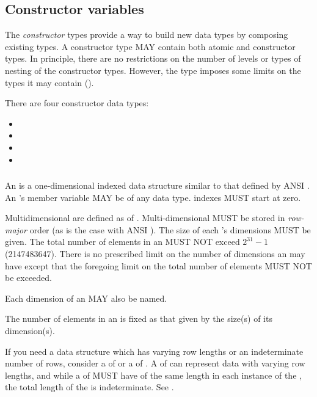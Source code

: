 \documentclass[justify]{nasa-ese}
\renewcommand{\new}[1]{\emph{#1}}
\begin{document}
\subsection{Constructor variables} 
\label{sec-constructor-vars}

The \new{constructor} types provide a way to build new data types by
composing existing types. A constructor type MAY contain both atomic
and constructor types. In principle, there are no restrictions on the
number of levels or types of nesting of the constructor types.
However, the \Grid type imposes some limits on the types it may
contain ().

There are four constructor data types:

\begin{itemize}
\item \Array
\item \Structure
\item \Grid
\item \Sequence
\end{itemize}

\subsubsection{\Array}
\label{sec-constructor-array}

An \Array is a one-dimensional indexed data structure similar to that defined
by ANSI \C. An \Array's member variable MAY be of any \DAP data type.
\Array indexes MUST start at zero.

Multidimensional \Arrays are defined as \Arrays of \Arrays. Multi-dimensional
\Arrays MUST be stored in \new{row-major} order (as is the case with ANSI
\C). The size of each \Array's dimensions MUST be given. The total number of
elements in an \Array MUST NOT exceed $2^{31}-1$ (2147483647). There is no
prescribed limit on the number of dimensions an \Array may have except that
the foregoing limit on the total number of elements MUST NOT be exceeded.

Each dimension of an \Array MAY also be named.

The number of elements in an \Array is fixed as that given by the size(s) of
its dimension(s).


If you need a data structure which has varying row lengths or an
indeterminate number of rows, consider a \Sequence of \Sequences or a
\Sequence of \Arrays. A \Sequence of \Sequences can represent data
with varying row lengths, and while a \Sequence of \Arrays MUST have
\Arrays of the same length in each instance of the \Sequence, the
total length of the \Sequence is indeterminate.  See
. 
\end{document}

